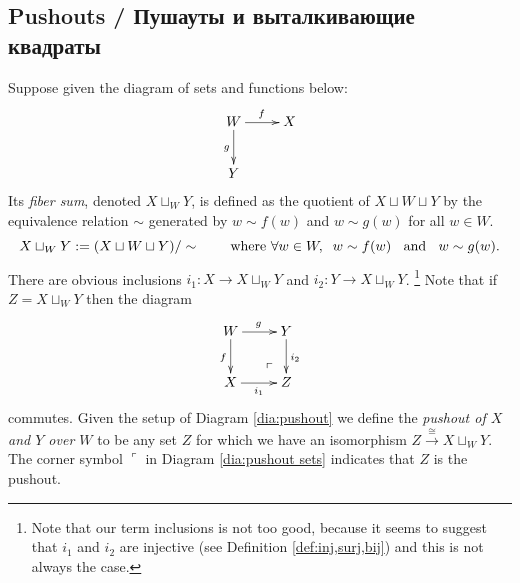 \documentclass[a4paper]{book}
\makeatletter
\def\tn{\textnormal}
\def\hsp{\hspace{.3in}}
\def\to{\rightarrow}
\def\taking{\colon}
\def\iso{\cong}
\def\lrlimit{\ar@{}[lu]|(.3)*+{\ulcorner}}
\newcommand{\To}[1]{\xrightarrow{#1}}
\theoremstyle{myth}
\newtheorem{definitionENG}[envENG]{\begin{english}Definition\end{english}}
\makeatother
\begin{document}
\begin{russian}

\subsection{Pushouts / Пушауты и выталкивающие квадраты}\label{sec:pushouts}

\begin{definitionENG}[Pushout]\label{def:pushout}
Suppose given the diagram of sets and functions below:
\begin{align}\label{dia:pushout}
\xymatrix{W\ar[r]^f\ar[d]_g&X\\Y}
\end{align}
Its {\em fiber sum}, denoted $X\sqcup_WY$, is defined as the quotient of $X\sqcup W\sqcup Y$ by the equivalence relation $\sim$ generated by $w\sim f(w)$ and $w\sim g(w)$ for all $w\in W$.
$$X\sqcup_WY:=(X\sqcup W\sqcup Y)/\sim \hsp\tn{where } \forall w\in W,\;\;  w\sim f(w)\;\;\tn{ and }\;\; w\sim g(w).$$ 
There are obvious inclusions $i_1\taking X\to X\sqcup_WY$ and $i_2\taking Y\to X\sqcup_WY$.%
\footnote{Note that our term inclusions is not too good, because it seems to suggest that $i_1$ and $i_2$ are injective (see Definition \ref{def:inj,surj,bij}) and this is not always the case.}
Note that if $Z=X\sqcup_WY$ then the diagram
\begin{align}\label{dia:pushout sets}
\xymatrix{W\ar[r]^g\ar[d]_f&Y\ar[d]^{i_2}\\X\ar[r]_-{i_1}&Z\lrlimit}
\end{align} 
commutes. Given the setup of Diagram \ref{dia:pushout} we define the {\em pushout of $X$ and $Y$ over $W$} to be any set $Z$ for which we have an isomorphism $Z\To{\iso}X\sqcup_WY$. The corner symbol $\ulcorner$ in Diagram \ref{dia:pushout sets} indicates that $Z$ is the pushout.
\end{definitionENG}


\end{russian}
\end{document}
